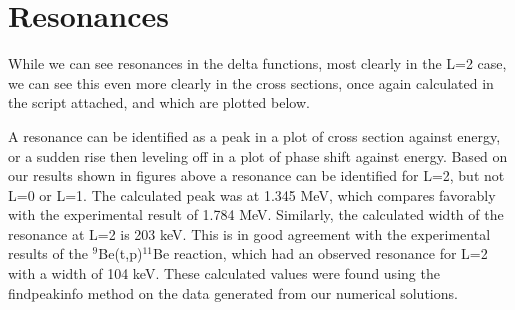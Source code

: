 \documentclass[11pt]{article} %
\begin{document}
\section{Resonances}

While we can see resonances in the delta functions, most clearly in the L=2 case, we can see this even more clearly in the cross sections, once again calculated in the script attached, and which are plotted below.\\


\vspace{.1mm}
\begin{figure}[htbp]
\centering
\begin{floatrow}
\quad
{}
\quad
{}
\end{floatrow}
\end{figure}
A resonance can be identified as a peak in a plot of cross section against energy, or a sudden rise then leveling off in a plot of phase shift against energy. Based on our results shown in figures above a resonance can be identified for L=2, but not L=0 or L=1. The calculated peak was at 1.345 MeV, which compares favorably with the experimental result of 1.784 MeV. Similarly, the calculated width of the resonance at L=2 is 203 keV. This is in good agreement with the experimental results of the $^{9}$Be(t,p)$^{11}$Be reaction, which had an observed resonance for L=2 with a width of 104 keV. These calculated values were found using the  findpeakinfo method on the data generated from our numerical solutions. 
\end{document}
